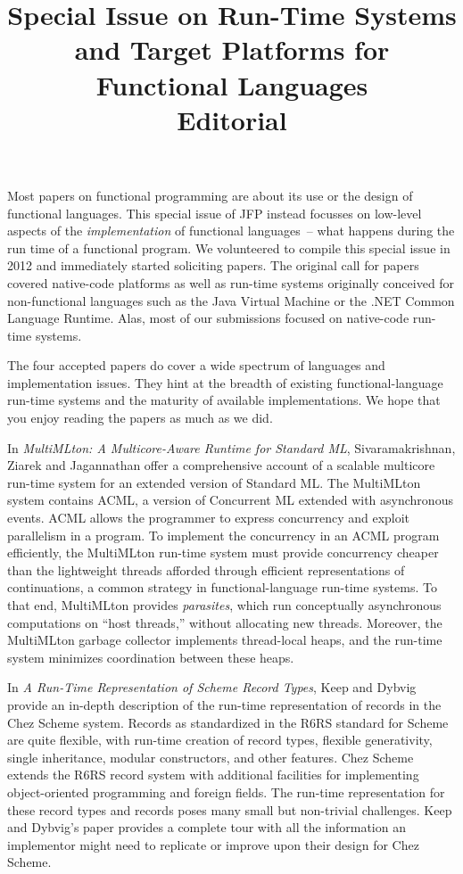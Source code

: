 \documentclass{jfp1}
\title[Special Issue on Run-Time Systems and Target Platforms for Functional Languages]
      {Special Issue on Run-Time Systems and Target Platforms for Functional Languages \\
Editorial}
\begin{document}
\maketitle

\noindent Most papers on functional programming are about its use or the design
of functional languages.  This special issue of JFP instead focusses
on low-level aspects of the \emph{implementation} of functional
languages~-- what happens during the run time of a functional program.
We volunteered to compile this special issue in 2012 and immediately
started soliciting papers.  The
original call for papers covered native-code platforms as well as
run-time systems originally conceived for non-functional languages
such as the Java Virtual Machine or the .NET Common Language Runtime.
Alas, most of our submissions focused on 
native-code run-time systems.  

The four accepted papers do
cover a wide spectrum of languages and implementation issues.  They
hint at the breadth of existing functional-language run-time systems
and the maturity of available implementations.  We hope that you enjoy
reading the papers as much as we did.

In \textit{MultiMLton: A Multicore-Aware Runtime for Standard ML},
Sivaramakrishnan, Ziarek and Jagannathan offer a comprehensive account
of a scalable multicore run-time system for an extended version of
Standard ML.  The MultiMLton system contains ACML, a version of
Concurrent ML extended with asynchronous events.  ACML allows the
programmer to express concurrency and exploit parallelism in a
program.  To implement the concurrency in an ACML program 
efficiently, the MultiMLton run-time system must provide
concurrency cheaper than the lightweight threads afforded through
efficient representations of continuations, a common strategy in
functional-language run-time systems.  To that end, MultiMLton provides
\textit{parasites}, which run conceptually asynchronous computations
on ``host threads,'' without allocating new threads.  Moreover, the
MultiMLton garbage collector implements thread-local heaps, and the
run-time system minimizes coordination between these heaps.

In \textit{A Run-Time Representation of Scheme Record Types}, Keep and
Dybvig provide an in-depth description of the run-time representation
of records in the Chez Scheme system.  Records as standardized in the
R6RS standard for Scheme are quite flexible, with run-time creation of
record types, flexible generativity, single inheritance, modular
constructors, and other features. Chez Scheme extends the R6RS record
system with additional facilities for implementing object-oriented programming
and foreign fields.  The run-time representation for these record types and
records poses many small but non-trivial challenges. Keep and Dybvig's paper
provides a complete tour with all the information an implementor might
need to replicate or improve upon their design for Chez Scheme.
\end{document}

